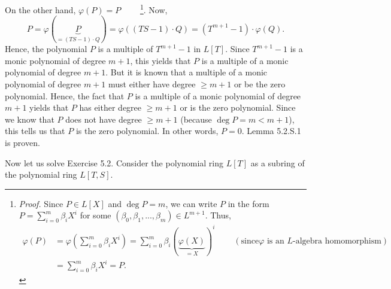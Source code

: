 \documentclass[numbers=enddot,12pt,final,onecolumn,notitlepage]{scrartcl}%
\begin{document}
On the other hand, $\varphi\left(  P\right)  =P$%
\ \ \ \ \footnote{\textit{Proof.} Since $P\in L\left[  X\right]  $ and $\deg
P=m$, we can write $P$ in the form $P=\sum\limits_{i=0}^{m}\beta_{i}X^{i}$ for
some $\left(  \beta_{0},\beta_{1},...,\beta_{m}\right)  \in L^{m+1}$. Thus,%
\begin{align*}
\varphi\left(  P\right)   &  =\varphi\left(  \sum\limits_{i=0}^{m}\beta
_{i}X^{i}\right)  =\sum\limits_{i=0}^{m}\beta_{i}\left(  \underbrace{\varphi
\left(  X\right)  }_{=X}\right)  ^{i}\ \ \ \ \ \ \ \ \ \ \left(  \text{since
}\varphi\text{ is an }L\text{-algebra homomorphism}\right) \\
&  =\sum\limits_{i=0}^{m}\beta_{i}X^{i}=P.
\end{align*}
}. Now,%
\[
P=\varphi\left(  \underbrace{P}_{=\left(  TS-1\right)  \cdot Q}\right)
=\varphi\left(  \left(  TS-1\right)  \cdot Q\right)  =\left(  T^{m+1}%
-1\right)  \cdot\varphi\left(  Q\right)  .
\]
Hence, the polynomial $P$ is a multiple of $T^{m+1}-1$ in $L\left[  T\right]
$. Since $T^{m+1}-1$ is a monic polynomial of degree $m+1$, this yields that
$P$ is a multiple of a monic polynomial of degree $m+1$. But it is known that
a multiple of a monic polynomial of degree $m+1$ must either have degree $\geq
m+1$ or be the zero polynomial. Hence, the fact that $P$ is a multiple of a
monic polynomial of degree $m+1$ yields that $P$ has either degree $\geq m+1$
or is the zero polynomial. Since we know that $P$ does not have degree $\geq
m+1$ (because $\deg P=m<m+1$), this tells us that $P$ is the zero polynomial.
In other words, $P=0$. Lemma 5.2.S.1 is proven.

Now let us solve Exercise 5.2. Consider the polynomial ring $L\left[
T\right]  $ as a subring of the polynomial ring $L\left[  T,S\right]  $.
\end{document}
